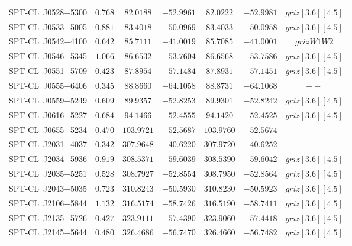 \begin{table}
{\begin{tabular}{ccccccc}
    SPT-CL~J0528$-$5300    &$ 0.768 $    &$ 82.0188 $    &$ -52.9961 $     &$ 82.0222 $    &$ -52.9981 $     & $griz[3.6][4.5]$    \\ 
    SPT-CL~J0533$-$5005    &$ 0.881 $    &$ 83.4018 $    &$ -50.0969 $     &$ 83.4033 $    &$ -50.0958 $     & $griz[3.6][4.5]$    \\ 
    SPT-CL~J0542$-$4100    &$ 0.642 $    &$ 85.7111 $    &$ -41.0019 $     &$ 85.7085 $    &$ -41.0001 $     & $grizW1W2$    \\ 
    SPT-CL~J0546$-$5345    &$ 1.066 $    &$ 86.6532 $    &$ -53.7604 $     &$ 86.6568 $    &$ -53.7586 $     & $griz[3.6][4.5]$    \\ 
    SPT-CL~J0551$-$5709    &$ 0.423 $    &$ 87.8954 $    &$ -57.1484 $     &$ 87.8931 $    &$ -57.1451 $     & $griz[3.6][4.5]$    \\ 
    SPT-CL~J0555$-$6406    &$ 0.345 $    &$ 88.8660 $    &$ -64.1058 $     &$ 88.8731 $    &$ -64.1068 $     & $--$    \\ 
    SPT-CL~J0559$-$5249    &$ 0.609 $    &$ 89.9357 $    &$ -52.8253 $     &$ 89.9301 $    &$ -52.8242 $     & $griz[3.6][4.5]$    \\ 
    SPT-CL~J0616$-$5227    &$ 0.684 $    &$ 94.1466 $    &$ -52.4555 $     &$ 94.1420 $    &$ -52.4525 $     & $griz[3.6][4.5]$    \\ 
    SPT-CL~J0655$-$5234    &$ 0.470 $    &$ 103.9721 $    &$ -52.5687 $     &$ 103.9760 $    &$ -52.5674 $     & $--$    \\ 
    SPT-CL~J2031$-$4037    &$ 0.342 $    &$ 307.9648 $    &$ -40.6220 $     &$ 307.9720 $    &$ -40.6252 $     & $--$    \\ 
    SPT-CL~J2034$-$5936    &$ 0.919 $    &$ 308.5371 $    &$ -59.6039 $     &$ 308.5390 $    &$ -59.6042 $     & $griz[3.6][4.5]$    \\ 
    SPT-CL~J2035$-$5251    &$ 0.528 $    &$ 308.7927 $    &$ -52.8554 $     &$ 308.7950 $    &$ -52.8564 $     & $griz[3.6][4.5]$    \\ 
    SPT-CL~J2043$-$5035    &$ 0.723 $    &$ 310.8243 $    &$ -50.5930 $     &$ 310.8230 $    &$ -50.5923 $     & $griz[3.6][4.5]$    \\ 
    SPT-CL~J2106$-$5844    &$ 1.132 $    &$ 316.5174 $    &$ -58.7426 $     &$ 316.5190 $    &$ -58.7411 $     & $griz[3.6][4.5]$    \\ 
    SPT-CL~J2135$-$5726    &$ 0.427 $    &$ 323.9111 $    &$ -57.4390 $     &$ 323.9060 $    &$ -57.4418 $     & $griz[3.6][4.5]$    \\ 
    SPT-CL~J2145$-$5644    &$ 0.480 $    &$ 326.4686 $    &$ -56.7470 $     &$ 326.4660 $    &$ -56.7482 $     & $griz[3.6][4.5]$    \\ 

\end{tabular}}
\end{table}
